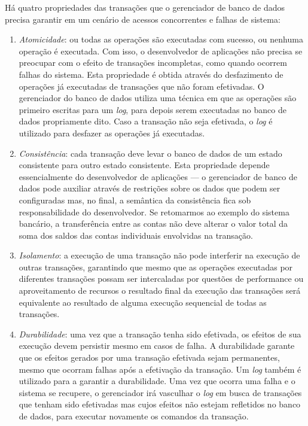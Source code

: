 \documentclass[11pt,twoside,a4paper]{book}
\begin{document}
Há quatro propriedades das transações que o gerenciador de banco de dados precisa garantir em um cenário de acessos concorrentes e falhas de sistema:

\begin{enumerate}
\item \emph{Atomicidade}: ou todas as operações são executadas com sucesso, ou nenhuma operação é executada. Com isso, o desenvolvedor de aplicações não precisa se preocupar com o efeito de transações incompletas, como quando ocorrem falhas do sistema. Esta propriedade é obtida através do desfazimento de operações já executadas de transações que não foram efetivadas. O gerenciador do banco de dados utiliza uma técnica em que as operações são primeiro escritas para um \emph{log}, para depois serem executadas no banco de dados propriamente dito. Caso a transação não seja efetivada, o \emph{log} é utilizado para desfazer as operações já executadas.
\item \emph{Consistência}: cada transação deve levar o banco de dados de um estado consistente para outro estado consistente. Esta propriedade depende essencialmente do desenvolvedor de aplicações --- o gerenciador de banco de dados pode auxiliar através de restrições sobre os dados que podem ser configuradas mas, no final, a semântica da consistência fica sob responsabilidade do desenvolvedor. Se retomarmos ao exemplo do sistema bancário, a transferência entre as contas não deve alterar o valor total da soma dos saldos das contas individuais envolvidas na transação.
\item \emph{Isolamento}: a execução de uma transação não pode interferir na execução de outras transações, garantindo que mesmo que as operações executadas por diferentes transações possam ser intercaladas por questões de performance ou aproveitamento de recursos o resultado final da execução das transações será equivalente ao resultado de alguma execução sequencial de todas as transações.
\item \emph{Durabilidade}: uma vez que a transação tenha sido efetivada, os efeitos de sua execução devem persistir mesmo em casos de falha. A durabilidade garante que os efeitos gerados por uma transação efetivada sejam permanentes, mesmo que ocorram falhas após a efetivação da transação. Um \emph{log} também é utilizado para a garantir a durabilidade. Uma vez que ocorra uma falha e o sistema se recupere, o gerenciador irá vasculhar o \emph{log} em busca de transações que tenham sido efetivadas mas cujos efeitos não estejam refletidos no banco de dados, para executar novamente os comandos da transação.
\end{enumerate}
\end{document}

